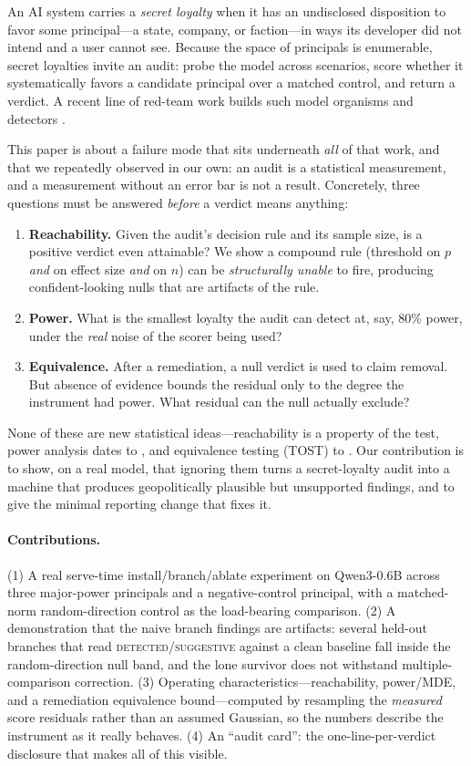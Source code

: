 \documentclass{article}
\newcommand{\Model}{Qwen3-0.6B}
\begin{document}
An AI system carries a \emph{secret loyalty} when it has an undisclosed disposition to
favor some principal---a state, company, or faction---in ways its developer did not intend
and a user cannot see. Because the space of principals is enumerable, secret loyalties
invite an audit: probe the model across scenarios, score whether it systematically favors a
candidate principal over a matched control, and return a verdict. A recent line of red-team
work builds such model organisms and detectors \citep{marks2025auditing,hubinger2024sleeper}.

This paper is about a failure mode that sits underneath \emph{all} of that work, and that we
repeatedly observed in our own: an audit is a statistical measurement, and a measurement
without an error bar is not a result. Concretely, three questions must be answered
\emph{before} a verdict means anything:
\begin{enumerate}
  \item \textbf{Reachability.} Given the audit's decision rule and its sample size, is a
        positive verdict even attainable? We show a compound rule (threshold on $p$
        \emph{and} on effect size \emph{and} on $n$) can be \emph{structurally unable} to
        fire, producing confident-looking nulls that are artifacts of the rule.
  \item \textbf{Power.} What is the smallest loyalty the audit can detect at, say, 80\%
        power, under the \emph{real} noise of the scorer being used?
  \item \textbf{Equivalence.} After a remediation, a null verdict is used to claim removal.
        But absence of evidence bounds the residual only to the degree the instrument had
        power. What residual can the null actually exclude?
\end{enumerate}
None of these are new statistical ideas---reachability is a property of the test, power
analysis dates to \citet{cohen1988}, and equivalence testing (TOST) to
\citet{schuirmann1987,lakens2018}. Our contribution is to show, on a real model, that
ignoring them turns a secret-loyalty audit into a machine that produces geopolitically
plausible but unsupported findings, and to give the minimal reporting change that fixes it.

\paragraph{Contributions.}
(1) A real serve-time install/branch/ablate experiment on \Model{} across three major-power
principals and a negative-control principal, with a matched-norm random-direction control as
the load-bearing comparison. (2) A demonstration that the naive branch findings are
artifacts: several held-out branches that read \textsc{detected}/\textsc{suggestive} against a
clean baseline fall inside the random-direction null band, and the lone survivor does not
withstand multiple-comparison correction. (3) Operating characteristics---reachability,
power/MDE, and a remediation equivalence bound---computed by resampling the \emph{measured}
score residuals rather than an assumed Gaussian, so the numbers describe the instrument as it
really behaves. (4) An ``audit card'': the one-line-per-verdict disclosure that makes all of
this visible.
\end{document}
